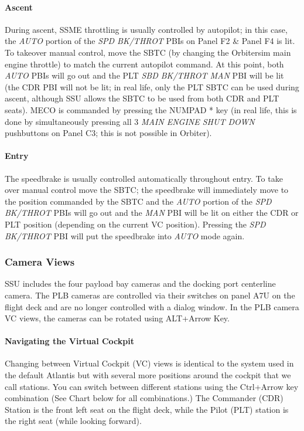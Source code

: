 \documentclass[13pt]{article}
\begin{document}
\begin{multicols*}{2}
\paragraph{Ascent}
During ascent, SSME throttling is usually controlled by autopilot; in this case, the \textit{AUTO} portion of the \textit{SPD BK/THROT} PBIs on Panel F2 \& Panel F4 is lit. To takeover manual control, move the SBTC (by changing the Orbitersim main engine throttle) to match the current autopilot command. At this point, both \textit{AUTO} PBIs will go out and the PLT \textit{SBD BK/THROT MAN} PBI will be lit (the CDR PBI will not be lit; in real life, only the PLT SBTC can be used during ascent, although SSU allows the SBTC to be used from both CDR and PLT seats). MECO is commanded by pressing the NUMPAD * key (in real life, this is done by simultaneously pressing all 3 \textit{MAIN ENGINE SHUT DOWN} pushbuttons on Panel C3; this is not possible in Orbiter).

\paragraph{Entry}
\label{sec:entry}
The speedbrake is usually controlled automatically throughout entry. To take over manual control move the SBTC; the speedbrake will immediately move to the position commanded by the SBTC and the \textit{AUTO} portion of the \textit{SPD BK/THROT} PBIs will go out and the \textit{MAN} PBI will be lit on either the CDR or PLT position (depending on the current VC position). Pressing the \textit{SPD BK/THROT} PBI will put the speedbrake into \textit{AUTO} mode again.


\subsubsection{Camera Views}
SSU includes the four payload bay cameras and the docking port centerline camera. The PLB cameras are controlled via their switches on panel A7U on the flight deck and are no longer controlled with a dialog window. In the PLB camera VC views, the cameras can be rotated using ALT+Arrow Key.

\paragraph{Navigating the Virtual Cockpit}
Changing between Virtual Cockpit (VC) views is identical to the system used in the default Atlantis but with several more positions around the cockpit that we call stations. You can switch between different stations using the Ctrl+Arrow key combination (See Chart below for all combinations.) The Commander (CDR) Station is the front left seat on the flight deck, while the Pilot (PLT) station is the right seat (while looking forward).\\


\end{multicols*}
\end{document}
